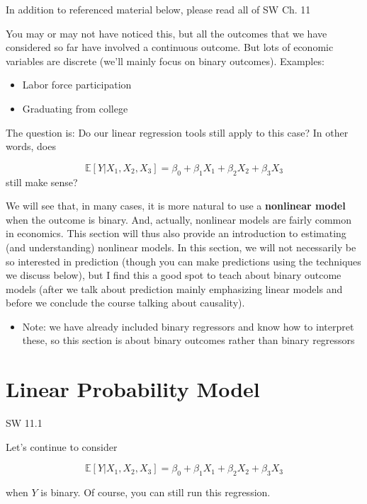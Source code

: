 \documentclass[
  letterpaper,
  DIV=11,
  numbers=noendperiod]{scrreprt}
\providecommand{\tightlist}{%
  \setlength{\itemsep}{0pt}\setlength{\parskip}{0pt}}\usepackage{longtable,booktabs,array}
\begin{document}
In addition to referenced material below, please read all of SW Ch. 11

You may or may not have noticed this, but all the outcomes that we have
considered so far have involved a continuous outcome. But lots of
economic variables are discrete (we'll mainly focus on binary outcomes).
Examples:

\begin{itemize}
\item
  Labor force participation
\item
  Graduating from college
\end{itemize}

The question is: Do our linear regression tools still apply to this
case? In other words, does

\[
  \mathbb{E}[Y | X_1, X_2, X_3] = \beta_0 + \beta_1 X_1 + \beta_2 X_2 + \beta_3 X_3
\] still make sense?

We will see that, in many cases, it is more natural to use a
\textbf{nonlinear model} when the outcome is binary. And, actually,
nonlinear models are fairly common in economics. This section will thus
also provide an introduction to estimating (and understanding) nonlinear
models. In this section, we will not necessarily be so interested in
prediction (though you can make predictions using the techniques we
discuss below), but I find this a good spot to teach about binary
outcome models (after we talk about prediction mainly emphasizing linear
models and before we conclude the course talking about causality).

\begin{itemize}
\tightlist
\item
  Note: we have already included binary regressors and know how to
  interpret these, so this section is about binary outcomes rather than
  binary regressors
\end{itemize}

\section{Linear Probability Model}\label{linear-probability-model}

SW 11.1

Let's continue to consider

\[
  \mathbb{E}[Y|X_1,X_2,X_3] = \beta_0 + \beta_1 X_1 + \beta_2 X_2 + \beta_3 X_3
\]

when \(Y\) is binary. Of course, you can still run this regression.
\end{document}
